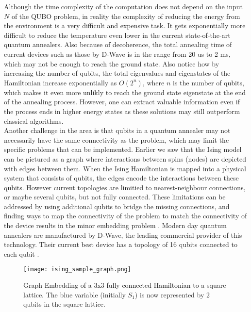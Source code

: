 \documentclass[12pt,a4paper]{report}
\begin{document}
\noindent
Although the time complexity of the computation does not depend on the input \( N \) of the QUBO problem, in reality the complexity of reducing the energy from the environment is a very difficult and expensive task. It gets exponentially more difficult to reduce the temperature even lower in the current state-of-the-art quantum annealers. Also because of decoherence, the total annealing time of current devices such as those by D-Wave is in the range from 20 us to 2 ms, which may not be enough to reach the ground state. Also notice how by increasing the number of qubits, the total eigenvalues and eigenstates of the Hamiltonian increase exponentially as \( O(2^n) \), where \( n \) is the number of qubits, which makes it even more unlikly to reach the ground state eigenstate at the end of the annealing process. However, one can extract valuable information even if the process ends in higher energy states as these solutions may still outperform classical algorithms.
\\

\noindent
Another challenge in the area is that qubits in a quantum annealer may not necessarily have the same connectivity as the problem, which may limit the specific problems that can be implemented. Earlier we saw that the Ising model can be pictured as a graph where interactions between spins (nodes) are depicted with edges between them. When the Ising Hamiltonian is mapped into a physical system that consists of qubits, the edges encode the interactions between these qubits. However current topologies are limitied to nearest-neighbour connections, or maybe several qubits, but not fully connected. These limitations can be addressed by using additional qubits to bridge the missing connections, and finding ways to map the connectivity of the problem to match the connectivity of the device results in the minor embedding problem \cite{graph_embeding_1, graph_embeding_2}. Modern day quantum annealers are manufactured by D-Wave, the leading commercial provider of this technology. Their current best device has a topology of 16 qubits connected to each qubit \cite{dwave_state_of_the_art}.


\begin{figure}[h]
    \centering
    \texttt{[image: ising\_sample\_graph.png]}
    \caption{Graph Embedding of a 3x3 fully connected Hamiltonian to a square lattice. The blue variable (initially \(S_1\)) is now represented by 2 qubits in the square lattice.}
    \label{fig:ising-graph-embedding}
\end{figure}
\end{document}
